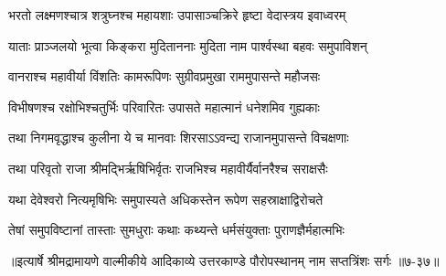 \twolineshloka
{भरतो लक्ष्मणश्चात्र शत्रुघ्नश्च महायशाः}
{उपासाञ्चक्रिरे हृष्टा वेदास्त्रय इवाध्वरम्} %

\twolineshloka
{याताः प्राञ्जलयो भूत्वा किङ्करा मुदिताननाः}
{मुदिता नाम पार्श्वस्था बहवः समुपाविशन्} %

\twolineshloka
{वानराश्च महावीर्या विंशतिः कामरूपिणः}
{सुग्रीवप्रमुखा राममुपासन्ते महौजसः} %

\twolineshloka
{विभीषणश्च रक्षोभिश्चतुर्भिः परिवारितः}
{उपासते महात्मानं धनेशमिव गुह्यकाः} %

\twolineshloka
{तथा निगमवृद्धाश्च कुलीना ये च मानवाः}
{शिरसाऽऽवन्द्य राजानमुपासन्ते विचक्षणाः} %

\twolineshloka
{तथा परिवृतो राजा श्रीमद्भिर्ऋषिभिर्वृतः}
{राजभिश्च महावीर्यैर्वानरैश्च सराक्षसैः} %

\twolineshloka
{यथा देवेश्वरो नित्यमृषिभिः समुपास्यते}
{अधिकस्तेन रूपेण सहस्राक्षाद्विरोचते} %

\twolineshloka
{तेषां समुपविष्टानां तास्ताः सुमधुराः कथाः}
{कथ्यन्ते धर्मसंयुक्ताः पुराणज्ञैर्महात्मभिः} %


॥इत्यार्षे श्रीमद्रामायणे वाल्मीकीये आदिकाव्ये उत्तरकाण्डे पौरोपस्थानम् नाम सप्तत्रिंशः सर्गः ॥७-३७॥
